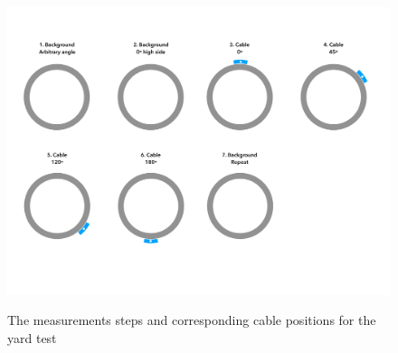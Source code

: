\documentclass[paper=a4, fontsize=11pt]{scrartcl}
\numberwithin{equation}{section}		%
\numberwithin{figure}{section}			%
\numberwithin{table}{section}				%
\begin{document}
\begin{figure}[h!]
    \centering
    \caption{The measurements steps and corresponding cable positions for the yard test}
    \includegraphics[width=1.0\textwidth]{figures/calibration_steps.pdf}
    \label{fig:calibration_steps}
\end{figure}
\end{document}
